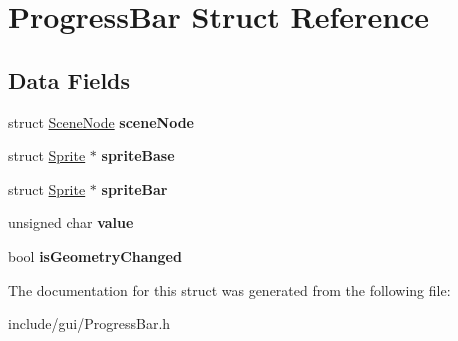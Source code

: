\hypertarget{struct_progress_bar}{}\section{Progress\+Bar Struct Reference}
\label{struct_progress_bar}
\subsection*{Data Fields}
\begin{DoxyCompactItemize}
\item 
\hypertarget{struct_progress_bar_aca8025f56fb4ce20b974ec9a3292a9e4}{}\label{struct_progress_bar_aca8025f56fb4ce20b974ec9a3292a9e4} 
struct \hyperlink{struct_scene_node}{Scene\+Node} {\bfseries scene\+Node}
\item 
\hypertarget{struct_progress_bar_a415c2cf0f85f8877a0b5db473ae1a9ef}{}\label{struct_progress_bar_a415c2cf0f85f8877a0b5db473ae1a9ef} 
struct \hyperlink{struct_sprite}{Sprite} $\ast$ {\bfseries sprite\+Base}
\item 
\hypertarget{struct_progress_bar_aa77bb96f1837c2ce8c1d2c0f3f3f8bb1}{}\label{struct_progress_bar_aa77bb96f1837c2ce8c1d2c0f3f3f8bb1} 
struct \hyperlink{struct_sprite}{Sprite} $\ast$ {\bfseries sprite\+Bar}
\item 
\hypertarget{struct_progress_bar_a537893029f1863ac865b24ec727c24b8}{}\label{struct_progress_bar_a537893029f1863ac865b24ec727c24b8} 
unsigned char {\bfseries value}
\item 
\hypertarget{struct_progress_bar_a8ea7e8ac3e3330830aa7a4309390f3ac}{}\label{struct_progress_bar_a8ea7e8ac3e3330830aa7a4309390f3ac} 
bool {\bfseries is\+Geometry\+Changed}
\end{DoxyCompactItemize}


The documentation for this struct was generated from the following file\+:\begin{DoxyCompactItemize}
\item 
include/gui/Progress\+Bar.\+h\end{DoxyCompactItemize}
